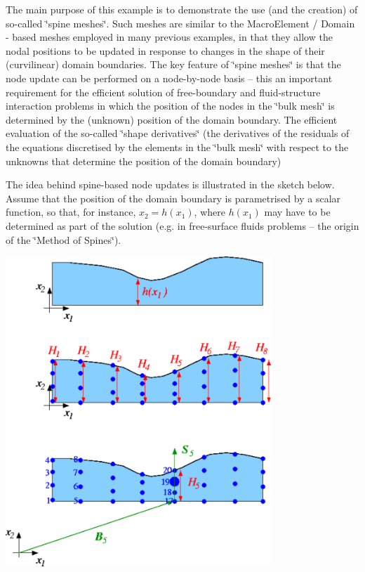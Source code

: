 The main purpose of this example is to demonstrate the use (and the creation) of so-\/called \char`\"{}spine meshes\char`\"{}. Such meshes are similar to the {\ttfamily Macro\+Element} / {\ttfamily Domain} -\/ based meshes employed in many previous examples, in that they allow the nodal positions to be updated in response to changes in the shape of their (curvilinear) domain boundaries. The key feature of \char`\"{}spine meshes\char`\"{} is that the node update can be performed on a node-\/by-\/node basis -- this an important requirement for the efficient solution of free-\/boundary and fluid-\/structure interaction problems in which the position of the nodes in the \char`\"{}bulk
mesh\char`\"{} is determined by the (unknown) position of the domain boundary. The efficient evaluation of the so-\/called \char`\"{}shape derivatives\char`\"{} (the derivatives of the residuals of the equations discretised by the elements in the \char`\"{}bulk mesh\char`\"{} with respect to the unknowns that determine the position of the domain boundary)

The idea behind spine-\/based node updates is illustrated in the sketch below. Assume that the position of the domain boundary is parametrised by a scalar function, so that, for instance, $ x_2 = h(x_1)$, where $ h(x_1)$ may have to be determined as part of the solution (e.\+g. in free-\/surface fluids problems -- the origin of the \char`\"{}\+Method of Spines\char`\"{}).

 
\begin{DoxyImage}
\includegraphics[width=0.75\textwidth]{spine_sketch}
\end{DoxyImage}


